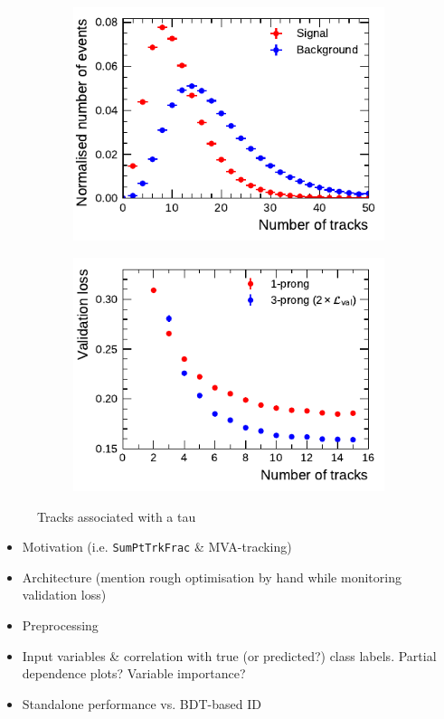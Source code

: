 \begin{figure}[ht]
  \begin{subfigure}[t]{0.48\textwidth}
    \centering
    \includegraphics{./figures/rnn/ntrk_1p.pdf}
  \end{subfigure}\hfill
  \begin{subfigure}[t]{0.48\textwidth}
    \centering
    \includegraphics{./figures/rnn/nscan/track_1p_3p.pdf}
  \end{subfigure}
  \caption{Tracks associated with a tau}
  \label{fig:rnn_ntracks}
\end{figure}

\begin{itemize}
\item Motivation (i.e. \texttt{SumPtTrkFrac} \& MVA-tracking)
\item Architecture (mention rough optimisation by hand while monitoring
  validation loss)
\item Preprocessing
\item Input variables \& correlation with true (or predicted?) class labels.
  Partial dependence plots? Variable importance?
\item Standalone performance vs. BDT-based ID
\end{itemize}

